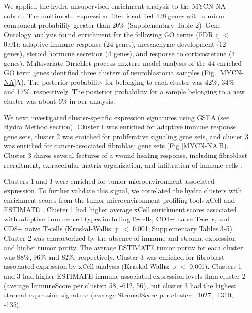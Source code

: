 \documentclass[10pt,letterpaper]{article}
\begin{document}
We applied the hydra unsupervised enrichment analysis to the MYCN-NA cohort. The multimodal expression filter identified 428 genes with a minor component probability greater than 20\% (Supplementary Table 2). Gene Ontology analysis found enrichment for the following GO terms (FDR q $<$ 0.01): adaptive immune response (24 genes), mesenchyme development (12 genes), steroid hormone secretion (4 genes), and response to corticosterone (4 genes). Multivariate Dirichlet process mixture model analysis of the 44 enriched GO term genes identified three clusters of neuroblastoma samples (Fig. \ref{MYCN-NA}A). The posterior probability for belonging to each cluster was 42\%, 34\%, and 17\%, respectively. The posterior probability for a sample belonging to a new cluster was about 6\% in our analysis. 

We next investigated cluster-specific expression signatures using GSEA (see Hydra Method section). Cluster 1 was enriched for adaptive immune response gene sets, cluster 2 was enriched for proliferative signaling gene sets, and cluster 3 was enriched for cancer-associated fibroblast gene sets (Fig \ref{MYCN-NA}B). Cluster 3 shares several features of a wound healing response, including fibroblast recruitment, extracellular matrix organization, and infiltration of immune cells \cite{fosterEvolvingRelationshipWound}. 

Clusters 1 and 3 were enriched for tumor microenvironment-associated expression. To further validate this signal, we correlated the hydra clusters with enrichment scores from the tumor microenvironment profiling tools xCell \cite{aranXCellDigitallyPortraying2017} and ESTIMATE \cite{yoshiharaInferringTumourPurity2013a}. Cluster 1 had higher average xCell enrichment scores associated with adaptive immune cell types including B-cells, CD4+ naive T-cells, and CD8+ naive T-cells (Kruskal-Wallis: p $<$ 0.001; Supplementary Tables 3-5). Cluster 2 was characterized by the absence of immune and stromal expression and higher tumor purity. The average ESTIMATE tumor purity for each cluster was 88\%, 96\% and 82\%, respectively. Cluster 3 was enriched for fibroblast-associated expression by xCell analysis (Kruskal-Wallis: p $<$ 0.001). Clusters 1 and 3 had higher ESTIMATE immune-associated expression levels than cluster 2 (average ImmuneScore per cluster: 58, -612, 56), but cluster 3 had the highest stromal expression signature (average StromalScore per cluster: -1027, -1310, -135).
\end{document}
